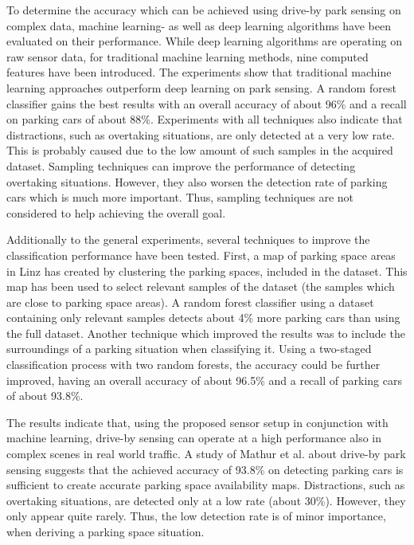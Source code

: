 
To determine the accuracy which can be achieved using drive-by park sensing on complex data, machine learning- as well as deep learning algorithms have been evaluated on their performance. While deep learning algorithms are operating on raw sensor data, for traditional machine learning methods, nine computed features have been introduced. The experiments show that traditional machine learning approaches outperform deep learning on park sensing. A random forest classifier gains the best results with an overall accuracy of about 96\% and a recall on parking cars of about 88\%. Experiments with all techniques also indicate that distractions, such as overtaking situations, are only detected at a very low rate. This is probably caused due to the low amount of such samples in the acquired dataset. Sampling techniques can improve the performance of detecting overtaking situations. However, they also worsen the detection rate of parking cars which is much more important. Thus, sampling techniques are not considered to help achieving the overall goal.

Additionally to the general experiments, several techniques to improve the classification performance have been tested. First, a map of parking space areas in Linz has created by clustering the parking spaces, included in the dataset. This map has been used to select relevant samples of the dataset (the samples which are close to parking space areas). A random forest classifier using a dataset containing only relevant samples detects about 4\% more parking cars than using the full dataset. Another technique which improved the results was to include the surroundings of a parking situation when classifying it. Using a two-staged classification process with two random forests, the accuracy could be further improved, having an overall accuracy of about 96.5\% and a recall of parking cars of about 93.8\%.

The results indicate that, using the proposed sensor setup in conjunction with machine learning, drive-by sensing can operate at a high performance also in complex scenes in real world traffic. 
A study of Mathur et al. about drive-by park sensing \cite{Mathur:2010:PDS:1814433.1814448} suggests that the achieved accuracy of 93.8\% on detecting parking cars is sufficient to create accurate parking space availability maps.
Distractions, such as overtaking situations, are detected only at a low rate (about 30\%). However, they only appear quite rarely. Thus, the low detection rate is of minor importance, when deriving a parking space situation.

